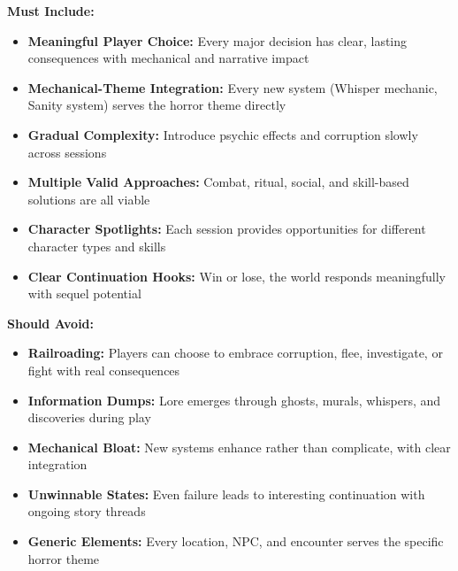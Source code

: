 \documentclass[11pt]{article}
\begin{document}
\begin{itemize}
\begin{itemize}
\begin{itemize}
\begin{itemize}
\begin{itemize}
\textbf{Must Include:} \begin{itemize} \item \checkmark \textbf{Meaningful Player Choice:} Every major decision has clear, lasting consequences with mechanical and narrative impact \item \checkmark \textbf{Mechanical-Theme Integration:} Every new system (Whisper mechanic, Sanity system) serves the horror theme directly \item \checkmark \textbf{Gradual Complexity:} Introduce psychic effects and corruption slowly across sessions \item \checkmark \textbf{Multiple Valid Approaches:} Combat, ritual, social, and skill-based solutions are all viable \item \checkmark \textbf{Character Spotlights:} Each session provides opportunities for different character types and skills \item \checkmark \textbf{Clear Continuation Hooks:} Win or lose, the world responds meaningfully with sequel potential \end{itemize}

\textbf{Should Avoid:} \begin{itemize} \item \checkmark \textbf{Railroading:} Players can choose to embrace corruption, flee, investigate, or fight with real consequences \item \checkmark \textbf{Information Dumps:} Lore emerges through ghosts, murals, whispers, and discoveries during play \item \checkmark \textbf{Mechanical Bloat:} New systems enhance rather than complicate, with clear integration \item \checkmark \textbf{Unwinnable States:} Even failure leads to interesting continuation with ongoing story threads \item \checkmark \textbf{Generic Elements:} Every location, NPC, and encounter serves the specific horror theme \end{itemize}


\end{itemize}
\end{itemize}
\end{itemize}
\end{itemize}
\end{itemize}
\end{document}
